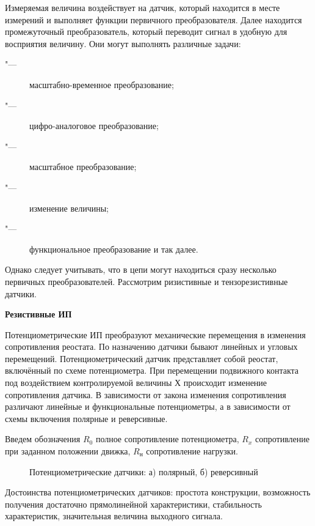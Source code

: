 \documentclass{article}
\begin{document}
Измеряемая величина воздействует на датчик, который находится в месте измерений
и выполняет функции первичного преобразователя. Далее находится промежуточный
преобразователь, который переводит сигнал в удобную для восприятия величину. Они
могут выполнять различные задачи:

\begin{description}
  \item["---] масштабно-временное преобразование;
  \item["---] цифро-аналоговое преобразование;
  \item["---] масштабное преобразование;
  \item["---] изменение величины;
  \item["---] функциональное преобразование и так далее.
\end{description}

Однако следует учитывать, что в цепи могут находиться сразу несколько первичных
преобразователей. Рассмотрим ризистивные и тензорезистивные датчики.

\vspace{1cm}
\begin{center}\textbf{\Large Резистивные ИП}\end{center}
\vspace{0.5cm}

Потенциометрические ИП преобразуют механические перемещения в изменения
сопротивления реостата. По назначению датчики бывают линейных и угловых
перемещений. Потенциометрический датчик представляет собой реостат, включённый
по схеме потенциометра. При перемещении подвижного контакта под воздействием
контролируемой величины Х происходит изменение сопротивления датчика. В
зависимости от закона изменения сопротивления различают линейные и
функциональные потенциометры, а в зависимости от схемы включения полярные и
реверсивные.

Введем обозначения $R_0$ полное сопротивление потенциометра, $R_x$ сопротивление
при заданном положении движка, $R_{\text{н}}$ сопротивление нагрузки.
\begin{figure}[h]
  \caption{Потенциометрические датчики: а) полярный, б) реверсивный}
  \label{fig:image}
\end{figure}

Достоинства потенциометрических датчиков: простота конструкции, возможность
получения достаточно прямолинейной характеристики, стабильность характеристик,
значительная величина выходного сигнала.
\end{document}
